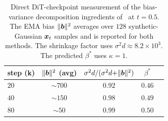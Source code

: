 \begin{table}[!t]
    \centering
    \caption{Direct DiT-checkpoint measurement of the bias-variance decomposition ingredients of~ at $t\!=\!0.5$. The EMA bias $\|{\bm{b}}\|^{2}$ averages over $128$ synthetic-Gaussian ${\bm{x}}_{t}$ samples and is reported for both methods. The shrinkage factor uses $\sigma^{2}d\!\approx\!8.2{\times}10^{3}$. The predicted $\beta^{\ast}$ uses $\kappa\!=\!1$.}
    \label{tab: dit-bias-shrinkage}
    \begin{tabular}{lcccc}
        \toprule
        step (k)                              & $\|{\bm{b}}\|^{2}$ (avg) & $\sigma^{2}d/(\sigma^{2}d{+}\|{\bm{b}}\|^{2})$ & $\beta^{\ast}$ \\
        \midrule
        $20$                                  & $\sim\!700$         & $0.92$                                    & $0.46$ \\
        $40$                                  & $\sim\!150$         & $0.98$                                    & $0.49$ \\
        $80$                                  & $\sim\!50$          & $0.99$                                    & $0.50$ \\
        \bottomrule
    \end{tabular}
\end{table}
